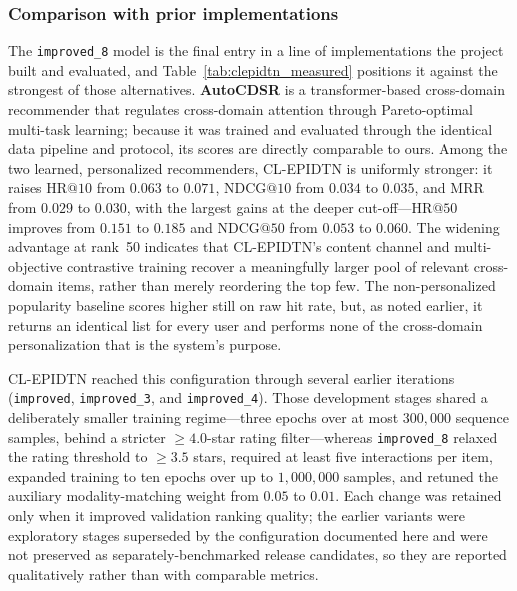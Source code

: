 \subsubsection{Comparison with prior implementations}
The \texttt{improved\_8} model is the final entry in a line of implementations the project built and evaluated, and Table~\ref{tab:clepidtn_measured} positions it against the strongest of those alternatives. \textbf{AutoCDSR} \cite{ju2025autocdsr} is a transformer-based cross-domain recommender that regulates cross-domain attention through Pareto-optimal multi-task learning; because it was trained and evaluated through the identical data pipeline and protocol, its scores are directly comparable to ours. Among the two learned, personalized recommenders, CL-EPIDTN is uniformly stronger: it raises $\mathrm{HR}@10$ from $0.063$ to $0.071$, $\mathrm{NDCG}@10$ from $0.034$ to $0.035$, and $\mathrm{MRR}$ from $0.029$ to $0.030$, with the largest gains at the deeper cut-off---$\mathrm{HR}@50$ improves from $0.151$ to $0.185$ and $\mathrm{NDCG}@50$ from $0.053$ to $0.060$. The widening advantage at rank~50 indicates that CL-EPIDTN's content channel and multi-objective contrastive training recover a meaningfully larger pool of relevant cross-domain items, rather than merely reordering the top few. The non-personalized popularity baseline scores higher still on raw hit rate, but, as noted earlier, it returns an identical list for every user and performs none of the cross-domain personalization that is the system's purpose.

CL-EPIDTN reached this configuration through several earlier iterations (\texttt{improved}, \texttt{improved\_3}, and \texttt{improved\_4}). Those development stages shared a deliberately smaller training regime---three epochs over at most $300{,}000$ sequence samples, behind a stricter $\geq 4.0$-star rating filter---whereas \texttt{improved\_8} relaxed the rating threshold to $\geq 3.5$ stars, required at least five interactions per item, expanded training to ten epochs over up to $1{,}000{,}000$ samples, and retuned the auxiliary modality-matching weight from $0.05$ to $0.01$. Each change was retained only when it improved validation ranking quality; the earlier variants were exploratory stages superseded by the configuration documented here and were not preserved as separately-benchmarked release candidates, so they are reported qualitatively rather than with comparable metrics.

